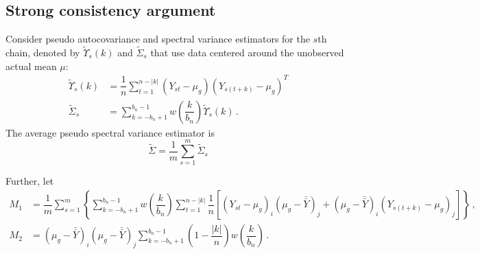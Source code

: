 \documentclass[11pt]{article}
\newcommand{\E}{\mathbb{E}}
\newcommand{\Var}{\text{Var}}
\theoremstyle{remark}
\begin{document}



\subsection{Strong consistency argument} \label{appendix:strong_consis}


Consider pseudo autocovariance and spectral variance estimators for the $s$th chain, denoted by $\tilde{\Upsilon}_s(k)$ and $\tilde{\Sigma}_s$ that use data centered around the unobserved actual mean $\mu$:
\begin{align*}
    \tilde{\Upsilon}_s(k) &= \dfrac{1}{n}\sum_{t=1}^{n-|k|}(Y_{st}-\mu_g)(Y_{s(t+k)}-\mu_g)^T \\ 
    \tilde{\Sigma}_s &= \sum_{k=-b_n+1}^{b_n-1}w\left(\dfrac{k}{b_n}\right)\tilde{\Upsilon}_s(k) \,.
\end{align*}
%
The average pseudo spectral variance estimator is
\[
\tilde{\Sigma} = \dfrac{1}{m}\sum\limits_{s=1}^{m}\tilde{\Sigma}_s
\]

Further, let
\begin{align*}
  M_1 & = \dfrac{1}{m}\sum\limits_{s=1}^{m}\left\{\sum\limits_{k=-b_n+1}^{b_n-1}w\left(\dfrac{k}{b_n}\right)\sum\limits_{t=1}^{n-|k|}\dfrac{1}{n}\left[ \left(Y_{st}-\mu_g \right)_i   \left(\mu_g-\bar{\bar{Y}} \right)_j +    \left(\mu_g-\bar{\bar{Y}} \right)_i  \left(Y_{s(t+k)}-\mu_g \right)_j \right]\right\}\,, \\ 
M_2 &= \left(\mu_g-\bar{\bar{Y}} \right)_i   \left(\mu_g-\bar{\bar{Y}} \right)_j\sum\limits_{k=-b_n+1}^{b_n-1}\left(1-\dfrac{|k|}{n}\right)w\left(\dfrac{k}{b_n}\right)\,.
\end{align*}
\end{document}
